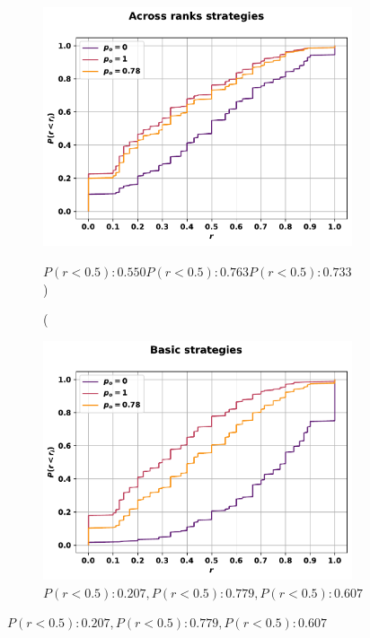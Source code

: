 \begin{figure}[!htbp]
\begin{subfigure}{.45\textwidth}
    \includegraphics[width=\textwidth]{src/chapters/07/img/cfd_to_probability_across_ranks_strategies.pdf}
    \caption(\(P(r<0.5): 0.550 P(r<0.5): 0.763 P(r<0.5): 0.733\))
    \end{subfigure}\hfill
    \begin{subfigure}{.45\textwidth}
    \includegraphics[width=\textwidth]{src/chapters/07/img/cfd_to_probability_basic_strategies.pdf}
    \caption{\(P(r<0.5): 0.207, P(r<0.5): 0.779, P(r<0.5): 0.607\)}
    \end{subfigure}
\end{figure}

